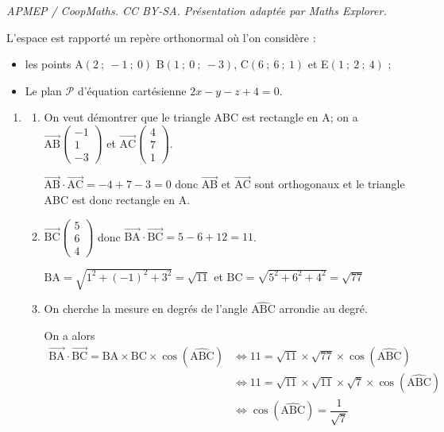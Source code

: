\documentclass[10pt]{article}
\providecommand{\vect}[1]{\overrightarrow{#1}}
\begin{document}
\noindent\textit{APMEP / CoopMaths. CC BY-SA. Présentation adaptée par Maths Explorer.}\par\medskip
\medskip

L'espace est rapporté un repère orthonormal où l'on considère :

\setlength\parindent{1cm}
\begin{itemize}
\item[$\bullet~~$]les points A$(2~;~-1~;~0)$ B$(1~;~0~;~- 3)$, C$(6~;~6~;~1)$  et E$(1~;~2~;~4)$ ;
\item[$\bullet~~$]Le plan $\mathcal{P}$ d'équation cartésienne $2x - y - z + 4 = 0$.
\end{itemize}
\setlength\parindent{0cm}

\medskip

\begin{enumerate}
\item
	\begin{enumerate}
		\item On veut démontrer que le triangle ABC est rectangle en A; on a 
$\vect{\text{AB}}\begin{pmatrix}-1\\1\\-3 \end{pmatrix}$ et $\vect{\text{AC}}\begin{pmatrix}4\\7\\1 \end{pmatrix}$.
		
$\vect{\text{AB}} \cdot \vect{\text{AC}}=-4 +7-3=0$ donc   $\vect{\text{AB}}$ et $\vect{\text{AC}}$ sont orthogonaux et le triangle ABC est donc rectangle en A.

		\item $\vect{\text{BC}}\begin{pmatrix}5\\6\\4 \end{pmatrix}$
donc $\vect{\text{BA}} \cdot \vect{\text{BC}}=5-6+12=11$.

$\text{BA}= \sqrt{1^2+(-1)^2+3^2}=\sqrt{11}$ et $\text{BC}=\sqrt{5^2+6^2+4^2} =\sqrt{77}$

		\item On cherche la mesure en degrés de l'angle $\widehat{\text{ABC}}$ arrondie au degré.

On a alors
\begin{align*}
\vect{\text{BA}} \cdot \vect{\text{BC}}= \text{BA}\times\text{BC}\times \cos\left(\widehat{\text{ABC}}\right)&\iff 11=\sqrt{11}\times \sqrt{77} \times \cos\left(\widehat{\text{ABC}}\right)\\
&\iff 11=\sqrt{11}\times \sqrt{11}\times \sqrt{7}\times \cos\left(\widehat{\text{ABC}}\right) \\
&\iff \cos\left(\widehat{\text{ABC}}\right) = \dfrac{1}{\sqrt{7}}
\end{align*}


\end{enumerate}
\end{enumerate}
\end{document}
